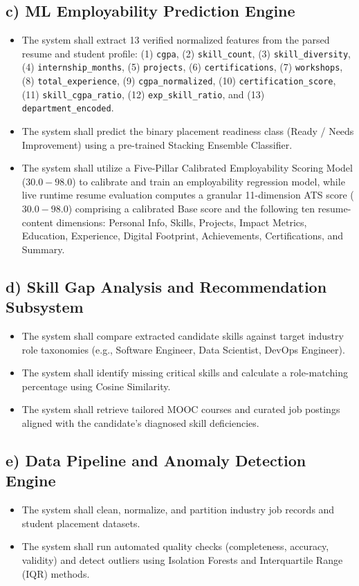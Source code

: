 \documentclass[12pt,a4paper]{report}
\begin{document}
\subsection*{c) ML Employability Prediction Engine}
\begin{itemize}
    \item The system shall extract 13 verified normalized features from the parsed resume and student profile: (1) \texttt{cgpa}, (2) \texttt{skill\_count}, (3) \texttt{skill\_diversity}, (4) \texttt{internship\_months}, (5) \texttt{projects}, (6) \texttt{certifications}, (7) \texttt{workshops}, (8) \texttt{total\_experience}, (9) \texttt{cgpa\_normalized}, (10) \texttt{certification\_score}, (11) \texttt{skill\_cgpa\_ratio}, (12) \texttt{exp\_skill\_ratio}, and (13) \texttt{department\_encoded}.
    \item The system shall predict the binary placement readiness class (Ready / Needs Improvement) using a pre-trained Stacking Ensemble Classifier.
    \item The system shall utilize a Five-Pillar Calibrated Employability Scoring Model ($30.0 - 98.0$) to calibrate and train an employability regression model, while live runtime resume evaluation computes a granular 11-dimension ATS score ($30.0 - 98.0$) comprising a calibrated Base score and the following ten resume-content dimensions: Personal Info, Skills, Projects, Impact Metrics, Education, Experience, Digital Footprint, Achievements, Certifications, and Summary.
\end{itemize}

\subsection*{d) Skill Gap Analysis and Recommendation Subsystem}
\begin{itemize}
    \item The system shall compare extracted candidate skills against target industry role taxonomies (e.g., Software Engineer, Data Scientist, DevOps Engineer).
    \item The system shall identify missing critical skills and calculate a role-matching percentage using Cosine Similarity.
    \item The system shall retrieve tailored MOOC courses and curated job postings aligned with the candidate's diagnosed skill deficiencies.
\end{itemize}

\subsection*{e) Data Pipeline and Anomaly Detection Engine}
\begin{itemize}
    \item The system shall clean, normalize, and partition industry job records and student placement datasets.
    \item The system shall run automated quality checks (completeness, accuracy, validity) and detect outliers using Isolation Forests and Interquartile Range (IQR) methods.
\end{itemize}
\end{document}
